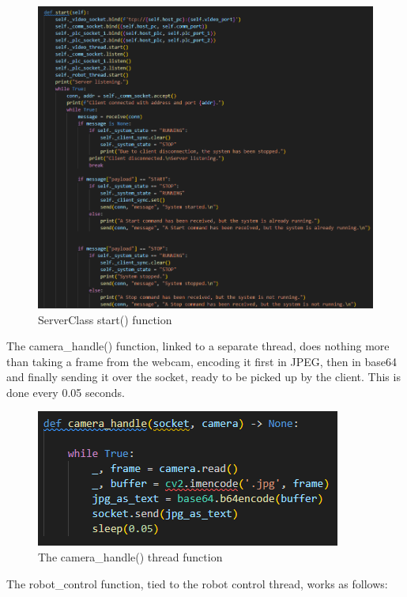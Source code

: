 \documentclass[a4paper,11pt]{report}
\theoremstyle{definition}
\theoremstyle{plain}
\begin{document}
        \begin{figure}[H]
        \includegraphics[scale=0.6]{images/Serverclass start.png}
        \centering
        \caption{ServerClass start() function}
        \end{figure}
        The camera\_handle() function, linked to a separate thread, does nothing more than taking a frame from the webcam, encoding it first in JPEG, then in base64 and finally sending it over the socket, ready to be picked up by the client. This is done every 0.05 seconds.
        \begin{figure}[H]
        \includegraphics[scale=0.7]{images/camera handle.png}
        \centering
        \caption{The camera\_handle() thread function}
        \end{figure}
        The robot\_control function, tied to the robot control thread, works as follows:
\end{document}
